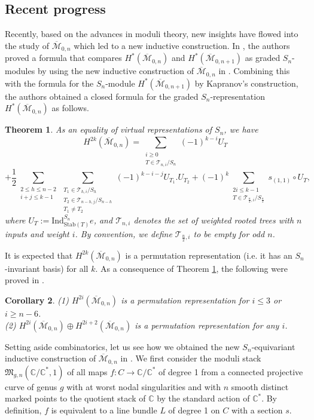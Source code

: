 \documentclass[11pt,letterpaper]{amsart}
\numberwithin{equation}{section}
\newtheorem{theorem}{Theorem}[section]
\newtheorem{corollary}[theorem]{Corollary}
\theoremstyle{definition}
\def\CC{\mathbb{C}}
\def\sT{\mathscr{T}}
\newcommand{\cal}{\mathcal}
\def\cM{{\cal M}}
\def\ocM{\overline{\cM}}
\def\mzn{\overline{\cM}_{0,n} }
\begin{document}

\subsection{Recent progress}
Recently, based on the advances in moduli theory, new insights have flowed into the study of $\mzn$ which led to a new inductive construction.
 In \cite[Theorem 4.8]{CKL1}, the authors proved a formula
that compares $H^*(\mzn)$ and $H^*(\ocM_{0,n+1})$ as graded $S_n$-modules by using
the new inductive construction of $\mzn$ in \cite{CK0}.
Combining this with the formula \cite[Proposition 5.12]{CKL1} for the $S_n$-module $H^*(\ocM_{0,n+1})$ by Kapranov's construction, the authors obtained a closed formula for the graded $S_n$-representation $H^*(\mzn)$ as follows.

\begin{theorem}\label{9} \cite[Theorem 6.1]{CKL1} As an equality of virtual representations of $S_n$, we have
    \[
 H^{2k}(\mzn)=       \sum_{\substack{i\geq 0 \\ T\in \sT_{n,i}/S_n}}(-1)^{k-i} U_T
 \] \[
 +\frac{1}{2}\sum_{\substack{2\leq h \leq n-2\\ i+j\leq k-1}}\sum_{\substack{T_1\in \sT_{h,i}/S_h\\ T_2\in \sT_{n-h,j}/S_{n-h}\\T_1\neq T_2}}(-1)^{k-i-j}U_{T_1}.U_{T_2}
 +(-1)^k\sum_{\substack{2i\leq k-1\\T\in \sT_{\frac{n}{2},i}/S_{\frac{n}{2}}}}s_{(1,1)}\circ U_T,
\]
where $U_T:=\mathrm{Ind}^{S_n}_{\mathrm{Stab}(T)}e$, and $\sT_{n,i}$ denotes the set of weighted rooted trees with $n$ inputs and weight $i$. By convention, we define $\sT_{\frac{n}{2},i}$ to be empty for odd $n$.
\end{theorem}

It is expected that $H^{2k}(\mzn)$ is a permutation representation (i.e. it has an $S_n$-invariant basis) for all $k$.
As a consequence of Theorem \ref{9}, the following were proved in \cite{CKL1}.
\begin{corollary}
(1) $H^{2i}(\mzn)$ is a permutation representation for $i\le 3$ or $i\ge n-6$.\\
(2) $H^{2i}(\mzn)\oplus H^{2i+2}(\mzn)$ is a permutation representation for any $i$.
\end{corollary}

Setting aside combinatorics, let us see how we obtained the new $S_n$-equivariant inductive construction of $\mzn$ in \cite{CK0}.
We first consider the moduli stack $\mathfrak{M}_{g,n}(\CC/\CC^*,1)$ of all maps $f:C\to \CC/\CC^*$ of degree 1 from a connected projective curve of genus $g$ with at worst nodal singularities and with $n$ smooth distinct marked points to the quotient stack of $\CC$ by the standard action of $\CC^*$.
By definition, $f$ is equivalent to a line bundle $L$ of degree 1 on $C$ with a section $s$.
\end{document}
